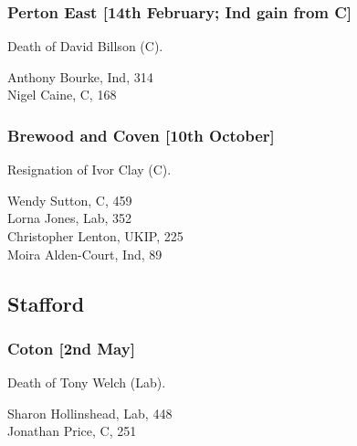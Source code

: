 \documentclass[a4paper,openany,10pt]{book}
\begin{document}
\subsubsection*{Perton East \hspace*{\fill}\nolinebreak[1]%
\enspace\hspace*{\fill}
[14th February; Ind gain from C]}


Death of David Billson (C).



Anthony Bourke, Ind, 314\\
Nigel Caine, C, 168\\


\subsubsection*{Brewood and Coven \hspace*{\fill}\nolinebreak[1]%
\enspace\hspace*{\fill}
[10th October]}


Resignation of Ivor Clay (C).



Wendy Sutton, C, 459\\
Lorna Jones, Lab, 352\\
Christopher Lenton, UKIP, 225\\
Moira Alden-Court, Ind, 89\\


\subsection*{Stafford}

\subsubsection*{Coton \hspace*{\fill}\nolinebreak[1]%
\enspace\hspace*{\fill}
[2nd May]}


Death of Tony Welch (Lab).



Sharon Hollinshead, Lab, 448\\
Jonathan Price, C, 251\\
\end{document}
